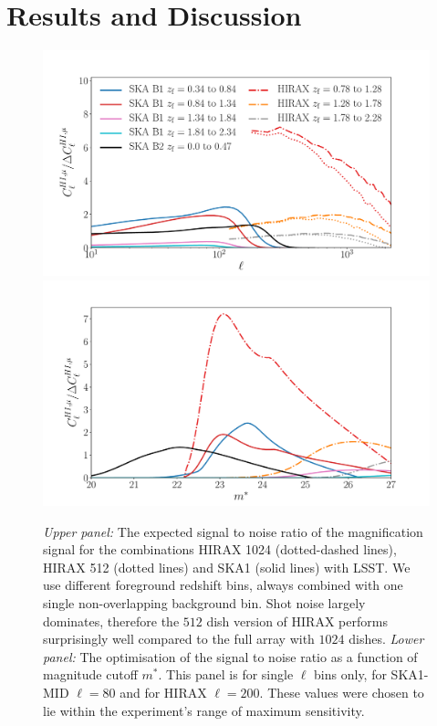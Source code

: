 \documentclass[useAMS,usenatbib]{mnras}
\begin{document}
\section{Results and Discussion}
\label{sec:results}

\begin{figure}
\centering\includegraphics[width=.99\columnwidth]{S2N_SKA_HIRAX.pdf}
\centering\includegraphics[width=0.99\columnwidth]{S2N_of_mstar.pdf}
\captionsetup{width=0.95\linewidth}
\caption{{\sl Upper panel:} The expected signal to noise ratio of the magnification signal for the combinations HIRAX 1024 (dotted-dashed lines), HIRAX 512 (dotted lines) and SKA1 (solid lines) with LSST. We use different foreground redshift bins, always combined with one single non-overlapping background bin. Shot noise largely dominates, therefore the $512$ dish version of HIRAX performs surprisingly well compared to the full array with $1024$ dishes.
{\sl Lower panel:} The optimisation of the signal to noise ratio as a function of magnitude cutoff $m^*$. This panel is for single $\ell$ bins only, for SKA1-MID $\ell = 80$ and for HIRAX $\ell = 200$. These values were chosen to lie within the experiment's range of maximum sensitivity.}
\captionsetup{width=.9\linewidth}
\label{fig:S2N}
\label{fig:S2Nmstar}
\end{figure}
\end{document}
